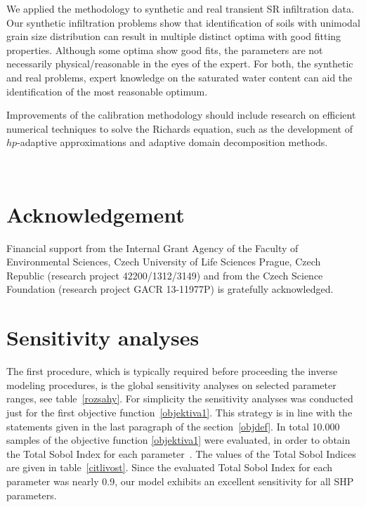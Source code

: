 \documentclass[review,times,3p,10pt]{elsarticle}
\begin{document}
We applied the methodology to synthetic and real transient SR infiltration data. Our synthetic infiltration problems show that identification of soils with unimodal grain size distribution can result in multiple distinct optima with good fitting properties. Although some optima show good fits, the parameters are not necessarily physical/reasonable in the eyes of the expert. For both, the synthetic and real problems, expert knowledge on the saturated water content can aid the identification of the most reasonable optimum. 

Improvements of the calibration methodology should include research on efficient numerical techniques to solve the Richards equation, such as the development of $hp$-adaptive approximations and adaptive domain decomposition  methods.




\bigskip
~
\bigskip

\section{Acknowledgement}

Financial support from the Internal Grant Agency of the Faculty of Environmental Sciences, Czech University of Life Sciences Prague, Czech Republic (research project 42200/1312/3149) and from the Czech Science Foundation (research project GACR 13-11977P) is gratefully acknowledged.




 


\appendix
 \section{Sensitivity analyses} 

The first procedure, which is typically required before proceeding the inverse modeling procedures, is the global sensitivity analyses on  selected parameter ranges, see table~\ref{rozsahy}. For simplicity the sensitivity analyses was conducted just for the first objective function~\eqref{objektiva1}. This strategy is in line with the statements given in the last paragraph of the section~\ref{objdef}. In total 10.000 samples of the objective function \eqref{objektiva1}  were evaluated, in order to obtain the  Total Sobol Index for each parameter~\citep{kniha-citlivost}. The values of the Total Sobol Indices are given in table~\ref{citlivost}. Since the evaluated Total Sobol Index for each parameter was nearly 0.9, our model exhibits an excellent sensitivity for all SHP parameters. 
\end{document}
